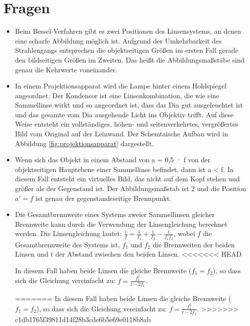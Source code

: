 \documentclass[11pt, a4paper]{article}
\begin{document}
    \section{Fragen}
    \begin{itemize}
        \item Beim Bessel-Verfahren gibt es zwei Positionen des Linsensystems, an denen eine scharfe Abbildung möglich ist. Aufgrund der Umkehrbarkeit des Strahlengangs entsprechen die objektseitigen Größen im ersten Fall gerade den bildseitigen Größen im Zweiten. Das heißt die Abbildungsmaßstäbe sind genau die Kehrwerte voneinander.
        \item In einem Projektionsapparat wird die Lampe hinter einem Hohlspiegel angeordnet. Der Kondensor ist eine Linsenkombination, die wie eine Sammellinse wirkt und so angeordnet ist, dass das Dia gut ausgeleuchtet ist und das gesamte vom Dia ausgehende Licht ins Objektiv trifft. Auf diese Weise entsteht ein vollständiges, höhen- und seitenverkehrtes, vergrößertes Bild vom Original auf der Leinwand. Der Schemtaische Aufbau wird in Abbildung \ref{fig:projektionsapparat} dargestellt.
        \item Wenn sich das Objekt in einem Abstand von a = 0,5 · f von der objektseitigen Hauptebene einer Sammellinse befindet, dann ist a < f. In diesem Fall entsteht ein virtuelles Bild, das nicht auf dem Kopf stehen und größer als der Gegenstand ist. Der Abbildungsmaßstab ist 2 und die Position $a'= f$ ist genau der gegenstandsseitige Brennpunkt.
        \item Die Gesamtbrennweite eines Systems zweier Sammellinsen gleicher Brennweite kann durch die Verwendung der Linsengleichung berechnet werden. Die Linsengleichung lautet: $\frac{1}{f} = \frac{1}{f_1} + \frac{1}{f_2} - \frac{t}{f_1 f_2}$, wobei $f$ die Gesamtbrennweite des Systems ist, $f_1$ und $f_2$ die Brennweiten der beiden Linsen und $t$ der Abstand zwischen den beiden Linsen.
<<<<<<< HEAD


        In diesem Fall haben beide Linsen die gleiche Brennweite ($f_1 = f_2$), so dass sich die Gleichung vereinfacht zu: $f = \frac{f_1^2}{t-2f_1}$. 

=======
        In diesem Fall haben beide Linsen die gleiche Brennweite ($f_1 = f_2$), so dass sich die Gleichung vereinfacht zu: $f = \frac{f_1^2}{t-2f_1}$. 
>>>>>>> c1db1765f39811d14f28b3cde6b5e69e0118b8ab
    \end{itemize}
\end{document}
